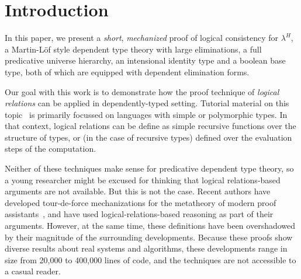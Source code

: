 \documentclass[acmsmall,screen=true,
\ifpublic review=false\else,review=true\fi
  ,anonymous=\ifanonymous true\else false\fi]{acmart}
\newcommand{\lang}{$\lambda^H$\xspace}
\newcommand{\scw}[1]{}
\newcommand{\yl}[1]{}
\begin{document}
\maketitle

\section{Introduction}
In this paper, we present a \emph{short}, \emph{mechanized} proof of logical
consistency for \lang{}, a Martin-Löf style dependent type theory with large
eliminations, a full predicative universe hierarchy, an intensional identity
type and a boolean base type, both of which are equipped with dependent
elimination forms.

Our goal with this work is to demonstrate how the proof technique of
\emph{logical relations} can be applied in dependently-typed setting.
Tutorial material on this topic~\cite{lr-tutorials} is primarily focussed on
languages with simple or polymorphic types. In that context, logical relations
can be define as simple recursive functions over the structure of types, or
(in the case of recursive types) defined over the evaluation steps of the
computation.

Neither of these techniques make sense for predicative dependent type theory,
so a young researcher might be excused for thinking that logical
relations-based arguments are not available.  \scw{Well, actually, we did use
  a step-indexed relation for Trellys\ldots}\yl{The core calculus of Trellys' logical fragment
  is simple type + identity so I don't think that counts..} But this is not the case. Recent
authors have developed tour-de-force mechanizations for the metatheory of
modern proof
assistants~\citep{nbeincoq,decagda,martin-lof-a-la-coq,anand2014towards}, and
have used logical-relations-based reasoning as part of their
arguments. However, at the same time, these definitions have been overshadowed
by their magnitude of the surrounding developments. Because these proofs show
diverse results about real systems and algorithms, these developments range in
size from 20,000 to 400,000 lines of code, and the techniques are not
accessible to a casual reader.
\end{document}
